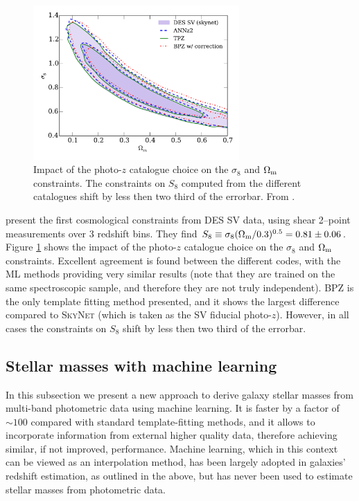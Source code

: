 \begin{figure}\centering \includegraphics[width=0.7\textwidth]{./chapters/chapter2/figs/Om_sig8_nz.pdf}\caption{Impact of the photo-$z$ catalogue choice on the $\sigma_8$ and $\Omega_{\rm m}$ constraints. The constraints on $S_8$ computed from the different catalogues shift by less then two third of the errorbar. From \citet{SVkey}.}\label{fig:keySV}\end{figure}

\citet{SVkey} present the first cosmological constraints from DES SV data, using shear 2--point measurements over 3 redshift bins. They find $S_8\equiv \sigma_8(\Omega_{\rm m}/0.3)^{0.5}=0.81\pm 0.06$. Figure \ref{fig:keySV} shows the impact of the photo-$z$ catalogue choice on the $\sigma_8$ and $\Omega_{\rm m}$ constraints. Excellent agreement is found between the different codes, with the ML methods providing very similar results (note that they are trained on the same spectroscopic sample, and therefore they are not truly independent). \textsc{BPZ} is the only template fitting method presented, and it shows the largest difference compared to \textsc{SkyNet} (which is taken as the SV fiducial photo-$z$). However, in all cases the constraints on $S_8$ shift by less then two third of the errorbar.


\subsection{Stellar masses with machine learning}

In this subsection we present a new approach to derive galaxy stellar masses from multi-band photometric data using machine learning. 
It is faster by a factor of $\sim 100$ compared with standard template-fitting methods, and it allows to incorporate information from external higher quality data, therefore achieving similar, if not improved, performance.
Machine learning, which in this context can be viewed as an interpolation method, has been largely adopted in galaxies' redshift estimation, as outlined in the above, but has never been used to estimate stellar masses from photometric data.

